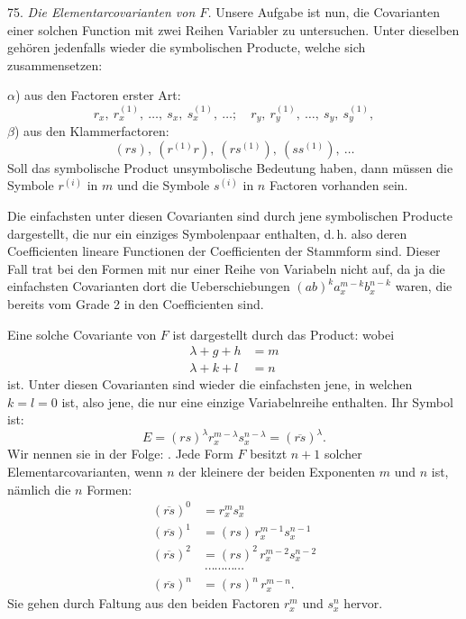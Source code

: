 75. \textit{Die Elementarcovarianten von $F$.} Unsere Aufgabe ist nun, die Covarianten einer solchen Function mit zwei Reihen Variabler zu untersuchen. Unter dieselben gehören jedenfalls wieder die symbolischen Producte, welche sich zusammensetzen:

$\alpha$) aus den Factoren erster Art:
\[
r_x,\ r_x^{(1)},\ \dots,\ s_x,\ s_x^{(1)},\ \dots;\quad r_y,\ r_y^{(1)},\ \dots,\ s_y,\ s_y^{(1)},
\]
$\beta$) aus den Klammerfactoren:
\[
(rs),\ (r^{(1)}r),\ (rs^{(1)}),\ (ss^{(1)}),\ \dots
\]
Soll das symbolische Product unsymbolische Bedeutung haben, dann müssen die Symbole $r^{(i)}$ in $m$ und die Symbole $s^{(i)}$ in $n$ Factoren vorhanden sein.

Die einfachsten unter diesen Covarianten sind durch jene symbolischen Producte dargestellt, die nur ein einziges Symbolenpaar enthalten, d.\,h. also deren Coefficienten lineare Functionen der Coefficienten der Stammform sind. Dieser Fall trat bei den Formen mit nur einer Reihe von Variabeln nicht auf, da ja die einfachsten Covarianten dort die Ueberschiebungen $(ab)^k a_x^{m-k}b_x^{n-k}$ waren, die bereits vom Grade 2 in den Coefficienten sind.

Eine solche Covariante von $F$ ist dargestellt durch das Product:
wobei
\[
\begin{aligned}
\lambda+g+h&=m\\
\lambda+k+l&=n
\end{aligned}
\]
ist. Unter diesen Covarianten sind wieder die einfachsten jene, in welchen $k=l=0$ ist, also jene, die nur eine einzige Variabelnreihe enthalten. Ihr Symbol ist:
\[
E=(rs)^\lambda r_x^{m-\lambda}s_x^{n-\lambda}=(\overline{rs})^\lambda.
\]
Wir nennen sie in der Folge: . Jede Form $F$ besitzt $n+1$ solcher Elementarcovarianten, wenn $n$ der kleinere der beiden Exponenten $m$ und $n$ ist, nämlich die $n$ Formen:
\[
\begin{aligned}
(\overline{rs})^0&=r_x^m s_x^n\\
(\overline{rs})^1&=(rs)\,r_x^{m-1}s_x^{n-1}\\
(\overline{rs})^2&=(rs)^2\,r_x^{m-2}s_x^{n-2}\\
&\ \cdots\cdots\cdots\cdots\\
(\overline{rs})^n&=(rs)^n\,r_x^{m-n}.
\end{aligned}
\]
Sie gehen durch Faltung aus den beiden Factoren $r_x^m$ und $s_x^n$ hervor.


